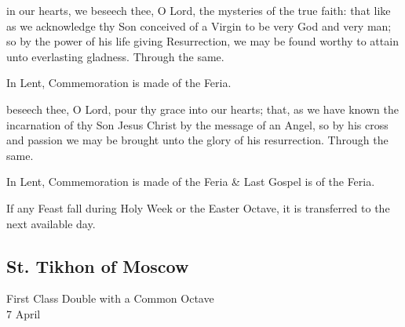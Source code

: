 
\vspace{-0.3\baselineskip}

\secret

\vspace{-0.1\baselineskip}

 in our hearts, we beseech thee, O Lord, the mysteries of the true faith: that like as we acknowledge thy Son conceived of a Virgin to be very God and very man; so by the power of his life giving Resurrection, we may be found worthy to attain unto everlasting gladness. Through the same.
\begin{rubric}
    In Lent, Commemoration is made of the Feria.%
\end{rubric}

\vspace{-0.3\baselineskip}

\postcommunion

\vspace{-0.1\baselineskip}

 beseech thee, O Lord, pour thy grace into our hearts; that, as we have known the incarnation of thy Son Jesus Christ by the message of an Angel, so by his cross and passion we may be brought unto the glory of his resurrection. Through the same.
\begin{rubric}
    In Lent, Commemoration is made of the Feria \& Last Gospel is of the Feria.
\end{rubric}

\begin{rubric}
    If any Feast fall during Holy Week or the Easter Octave, it is transferred to the next available day.
\end{rubric}


\subsection{St. Tikhon of Moscow}
\begin{inhead}
    {First Class Double with a Common Octave\\
7 April}
\end{inhead}

